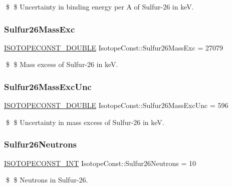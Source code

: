 \$ \$ Uncertainty in binding energy per A of Sulfur-\/26 in keV. \mbox{\label{group___isotope_const-_sulfur-_s26_ga9f3fda9b51afda3e776542ab2f21bfed}} 
\subsubsection{\texorpdfstring{Sulfur26\+Mass\+Exc}{Sulfur26MassExc}}
{\footnotesize\ttfamily \mbox{\hyperlink{group___isotope_const-_macros_ga8f45a7272ce02c0b4c65c44636ed719a}{I\+S\+O\+T\+O\+P\+E\+C\+O\+N\+S\+T\+\_\+\+D\+O\+U\+B\+LE}} Isotope\+Const\+::\+Sulfur26\+Mass\+Exc = 27079}

\$ \$ Mass excess of Sulfur-\/26 in keV. \mbox{\label{group___isotope_const-_sulfur-_s26_ga195fa9c90828aca7d02d56a152bb68d4}} 
\subsubsection{\texorpdfstring{Sulfur26\+Mass\+Exc\+Unc}{Sulfur26MassExcUnc}}
{\footnotesize\ttfamily \mbox{\hyperlink{group___isotope_const-_macros_ga8f45a7272ce02c0b4c65c44636ed719a}{I\+S\+O\+T\+O\+P\+E\+C\+O\+N\+S\+T\+\_\+\+D\+O\+U\+B\+LE}} Isotope\+Const\+::\+Sulfur26\+Mass\+Exc\+Unc = 596}

\$ \$ Uncertainty in mass excess of Sulfur-\/26 in keV. \mbox{\label{group___isotope_const-_sulfur-_s26_ga0bdab41f5452502a54af4d8394b1f9a3}} 
\subsubsection{\texorpdfstring{Sulfur26\+Neutrons}{Sulfur26Neutrons}}
{\footnotesize\ttfamily \mbox{\hyperlink{group___isotope_const-_macros_ga5f18360b3e99483a35c32d789e62621c}{I\+S\+O\+T\+O\+P\+E\+C\+O\+N\+S\+T\+\_\+\+I\+NT}} Isotope\+Const\+::\+Sulfur26\+Neutrons = 10}

\$ \$ Neutrons in Sulfur-\/26. \mbox{\label{group___isotope_const-_sulfur-_s26_ga4f318d916d0e29a548bcf8dabfd9fc78}} 
